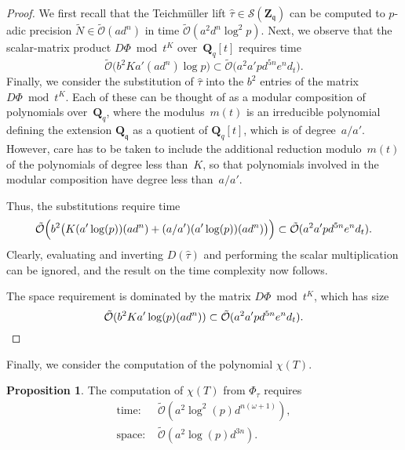 \documentclass[a4paper,11pt]{article}
\numberwithin{equation}{section}
\newcommand{\ZZ}{\mathbf{Z}} %
\newcommand{\QQ}{\mathbf{Q}} %
\providecommand{\SoftOh}{\tilde{\mathcal{O}}} %
\theoremstyle{definition}
\newtheorem{prop}[thm]{Proposition}
\begin{document}
\begin{proof}
We first recall that the Teichm\"uller lift 
$\hat{\tau} \in \mathcal{S}(\ZZ_{\mathfrak{q}})$ 
can be computed to $p$-adic precision $\tilde{N} \in \SoftOh(a d^n)$ 
in time $\SoftOh(a^2 d^n \log^2 p)$.  Next, we observe that the 
scalar-matrix product $D \Phi \bmod t^K$ over~$\QQ_q[t]$ 
requires time 
\begin{equation*}
\SoftOh\bigl( b^2 K a' (a d^n) \log p \bigr) 
    \subset \SoftOh\bigl( a^2 a' p d^{5n} e^n d_t \bigr).
\end{equation*}
Finally, we consider the substitution of $\hat{\tau}$ 
into the $b^2$ entries of the matrix $D \Phi \bmod t^K$. 
Each of these can be thought of as a modular composition of polynomials 
over~$\QQ_{q}$, where the modulus~$m(t)$ is an irreducible polynomial defining 
the extension $\QQ_{\mathfrak{q}}$ as a quotient of $\QQ_q[t]$, which is 
of degree~$a/a'$. However, care has to be taken to include the additional 
reduction modulo~$m(t)$ of the polynomials of degree less than~$K$, so that 
polynomials involved in the modular composition have degree less 
than~$a/a'$. 

Thus, the substitutions require time 
\begin{equation*}
\SoftOh\Bigl( b^2 \bigl(K (a' \log(p)) (a d^n) + (a/a') (a' \log(p)) (a d^n) \bigr) \Bigr)
    \subset \SoftOh(a^2 a' p d^{5n} e^n d_t).
\end{equation*}
Clearly, evaluating and inverting $D(\hat{\tau})$ and performing the 
scalar multiplication can be ignored, and the result on the time complexity now follows.

The space requirement is dominated by the matrix $D\Phi \bmod t^K$, 
which has size 
\begin{equation*}
\SoftOh(b^2 K a' \log(p) (a d^n)) \subset \SoftOh(a^2 a' p d^{5n} e^n d_t). 
\qedhere
\end{equation*}
\end{proof}

Finally, we consider the computation of the polynomial $\chi(T)$.

\begin{prop}
The computation of $\chi(T)$ from $\Phi_{\tau}$ requires
\begin{align*}
\mbox{time: }  & \SoftOh(a^2  \log^2(p) d^{n(\omega+1)}), \\
\mbox{space: } & \SoftOh(a^2 \log(p) d^{3n}).
\end{align*}
\end{prop}
\end{document}
